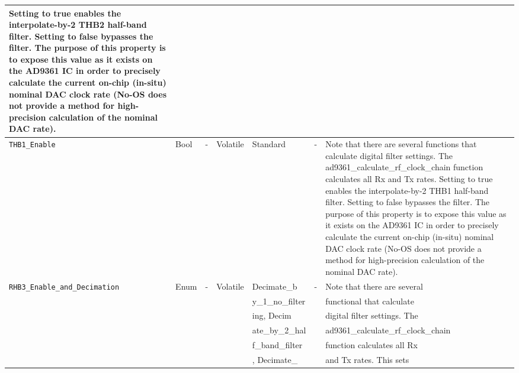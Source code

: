 \documentclass{article}
\begin{document}
\begin{landscape}
\begin{scriptsize}
\begin{longtable}{|p{3.6cm}|p{8.1cm}|p{1.4cm}|p{1.3cm}|p{1.4cm}|p{2.5cm}|p{3.6cm}|}
                                 Setting to true enables the interpolate-by-2
                                 THB2 half-band filter. Setting to false
                                 bypasses the filter. The purpose of this
                                 property is to expose this value as it exists
                                 on the AD9361 IC in order to precisely
                                 calculate the current on-chip (in-situ) nominal
                                 DAC clock rate (No-OS does not provide a method
                                 for high-precision calculation of the nominal
                                 DAC rate). \\
			\hline
			\verb+THB1_Enable+ & Bool & - & Volatile & Standard & - & 
                               Note that there are several
                                 functions that calculate digital filter
                                 settings. The ad9361\_calculate\_rf\_clock\_chain
                                 function calculates all Rx and Tx rates.
                                 Setting to true enables the interpolate-by-2
                                 THB1 half-band filter. Setting to false
                                 bypasses the filter. The purpose of this
                                 property is to expose this value as it exists
                                 on the AD9361 IC in order to precisely
                                 calculate the current on-chip (in-situ) nominal
                                 DAC clock rate (No-OS does not provide a method
                                 for high-precision calculation of the nominal
                                 DAC rate). \\
			\hline
			\verb+RHB3_Enable_and_Decimation+ & Enum & - & Volatile & Decimate\_b & - &  Note that there are several \\
			                              &      &   &          & y\_1\_no\_filter      &   & functional that calculate \\
			                              &      &   &          & ing, Decim           &   & digital filter settings. The \\
			                              &      &   &          & ate\_by\_2\_hal    &   &  ad9361\_calculate\_rf\_clock\_chain \\
			                              &      &   &          & f\_band\_filter   &   &  function calculates all Rx \\
			                              &      &   &          & , Decimate\_      &   &  and Tx rates. This sets \\

\end{longtable}
\end{scriptsize}
\end{landscape}
\end{document}
